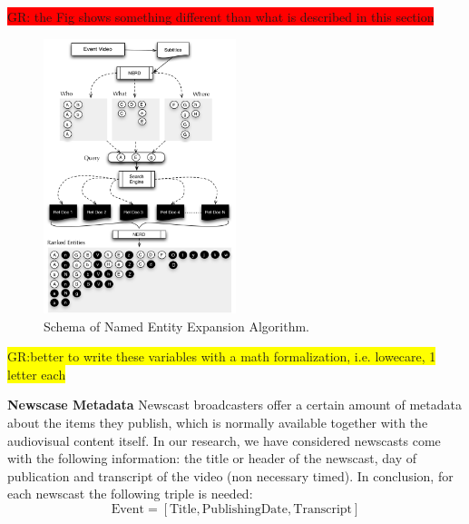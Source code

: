 \documentclass{llncs}
\newcommand{\hg}[1]{\colorbox{yellow}{#1}}
\newcommand{\todo}[1]{\colorbox{red}{#1}}
\begin{document}
\todo{GR: the Fig shows something different than what is described in this section}
\begin{figure}[h!]
\centering
\includegraphics[width=0.5\textwidth]{figure/ExpansionDiagram}
\caption{Schema of Named Entity Expansion Algorithm.}
\label{fig:namedEntityExpansion}%
\end{figure}

\hg{GR:better to write these variables with a math formalization, i.e. lowecare, 1 letter each}

{\bf Newscase Metadata} %
Newscast broadcasters offer a certain amount of metadata about the items they publish, which is normally available together with the audiovisual content itself. In our research, we have considered newscasts come with the following information: the title or header of the newscast, day of publication and transcript of the video (non necessary timed). In conclusion, for each newscast the following triple is needed:
\begin{equation}
\text{Event} =\left [ \text{Title}, \text{PublishingDate}, \text{Transcript} \right ]
\end{equation}
\end{document}

